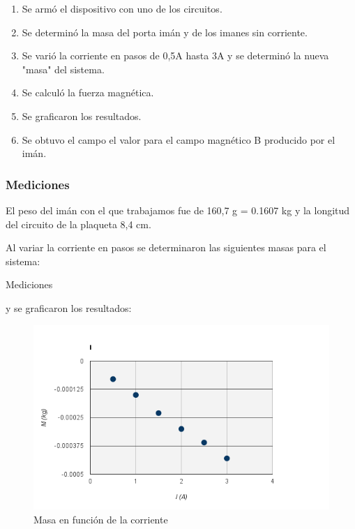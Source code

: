 \documentclass{article}
\begin{document}
\begin{enumerate}
  \item Se armó el dispositivo con uno de los circuitos.
  \item Se determinó la masa del porta imán y de los imanes sin corriente.
  \item Se varió la corriente en pasos de 0,5A hasta 3A y se determinó la nueva "masa" del sistema.
  \item Se calculó la fuerza magnética.
  \item Se graficaron los resultados.
  \item Se obtuvo el campo el valor para el campo magnético B producido por el imán.
\end{enumerate}

\subsubsection{Mediciones}
El peso del imán con el que trabajamos fue de 160,7 g = 0.1607 kg y la longitud del circuito de la plaqueta 8,4 cm.

Al variar la corriente en pasos se determinaron las siguientes masas para el sistema:
\begin{table}[H]
\centering

\caption{Mediciones}
\label{tab:my_label}
\end{table}

y se graficaron los resultados:

\begin{figure}[H]
\centering
\includegraphics[width=\textwidth]{mediciones_primer_experiencia.png}
\caption{Masa en función de la corriente}
\label{fig:1}
\end{figure} 
\end{document}
